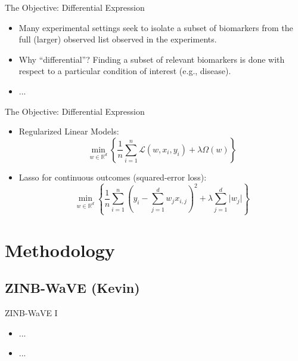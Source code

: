 \documentclass{beamer}
\newcommand{\R}{\mathbb{R}}
\newcommand{\lik}{\mathcal{L}}
\begin{document}
\begin{frame}{The Objective: Differential Expression}

\begin{itemize}
  \itemsep12pt
  \item Many experimental settings seek to isolate a subset of biomarkers from
    the full (larger) observed list observed in the experiments.
  \item Why ``differential''? Finding a subset of relevant biomarkers is done
    with respect to a particular condition of interest (e.g., disease).
  \item ...
\end{itemize}

\end{frame}


\begin{frame}{The Objective: Differential Expression}

\begin{itemize}
  \itemsep12pt
  \item Regularized Linear Models:
    \[
      \min_{w \in \R^d} \left\{ \frac{1}{n} \sum_{i = 1}^n \lik(w, x_i, y_i) +
        \lambda \Omega(w) \right\}
    \]
  \item Lasso for continuous outcomes (squared-error loss):
    \[
      \min_{w \in \R^d} \left\{ \frac{1}{n} \sum_{i = 1}^n \left(y_i - \sum_{j =
        1}^d w_j x_{i,j} \right)^2 + \lambda \sum_{j = 1}^d \lvert w_j \rvert
        \right\}
    \]
\end{itemize}

\end{frame}

\section{Methodology}
\subsection{ZINB-WaVE (Kevin)}

\begin{frame}{ZINB-WaVE I}

\begin{itemize}
  \itemsep12pt
  \item ...
  \item ...
\end{itemize}

\end{frame}
\end{document}
